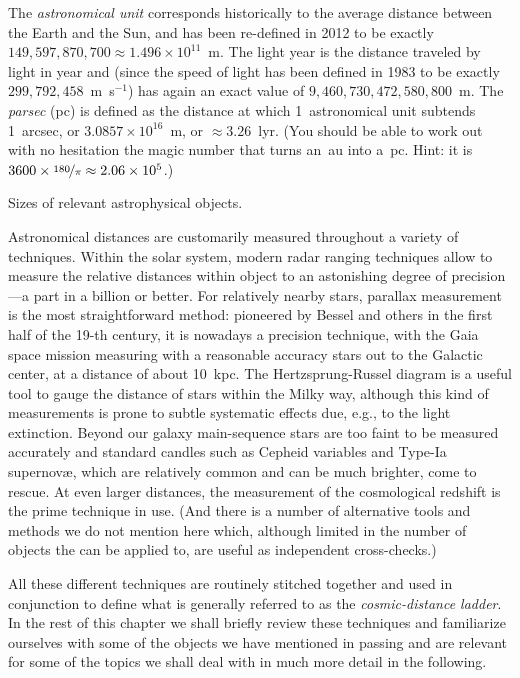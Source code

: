 The \emph{astronomical unit} corresponds historically to the average distance
between the Earth and the Sun, and has been re-defined in 2012 to be exactly
$149,597,870,700 \approx 1.496 \times 10^{11}$~m.
The light year is the distance traveled by light in year and (since the speed of
light has been defined in 1983 to be exactly $299,792,458$~m~s$^{-1}$) has again
an exact value of $9,460,730,472,580,800$~m. The \emph{parsec} (pc) is defined
as the distance at which 1~astronomical unit subtends 1~arcsec, or
$3.0857 \times 10^{16}$~m, or $\approx 3.26$~lyr. (You should be able to work out
with no hesitation the magic number that turns an~au into a~pc. Hint: it is
$3600 \times \nicefrac{180}{\pi} \approx 2.06 \times 10^5$.)

\begin{marginfigure}[]
	
	\caption{Sizes of relevant astrophysical objects.}
\end{marginfigure}

Astronomical distances are customarily measured throughout a variety of techniques.
Within the solar system, modern radar ranging techniques allow to measure the relative
distances within object to an astonishing degree of precision---a part in a billion
or better. For relatively nearby stars, parallax measurement is the most
straightforward method: pioneered by Bessel and others in the first half of the
19-th century, it is nowadays a precision technique, with the Gaia space mission
measuring with a reasonable accuracy stars out to the Galactic center, at a distance
of about 10~kpc. The Hertzsprung-Russel diagram is a useful tool to gauge the distance
of stars within the Milky way, although this kind of measurements is prone to subtle
systematic effects due, e.g., to the light extinction. Beyond our galaxy main-sequence
stars are too faint to be measured accurately and standard candles such as Cepheid
variables and Type-Ia supernov\ae, which are relatively common and can be much brighter,
come to rescue. At even larger distances, the measurement of the cosmological redshift
is the prime technique in use. (And there is a number of alternative tools and methods
we do not mention here which, although limited in the number of objects the can
be applied to, are useful as independent cross-checks.)

All these different techniques are routinely stitched together and used in conjunction
to define what is generally referred to as the \emph{cosmic-distance ladder}.
In the rest of this chapter we shall briefly review these techniques and
familiarize ourselves with some of the objects we have mentioned in passing and
are relevant for some of the topics we shall deal with in much more detail in the
following.



